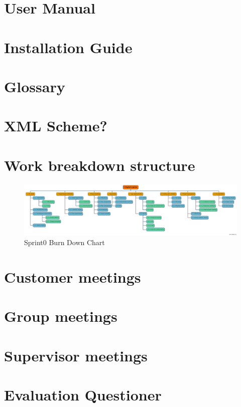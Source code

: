 \chapter{User Manual}

\chapter{Installation Guide}

\chapter{Glossary}

\chapter{XML Scheme?}

\chapter{Work breakdown structure} \label{txt:work_breakdown_structure}

\begin{figure}[!h]
	\centering
		\includegraphics[width=12cm, angle=90]{planning/wbs.png}
	\caption{Sprint0 Burn Down Chart}
	\label{fig:wbs}
\end{figure}

\chapter{Customer meetings}

\chapter{Group meetings}

\chapter{Supervisor meetings}

\chapter{Evaluation Questioner}